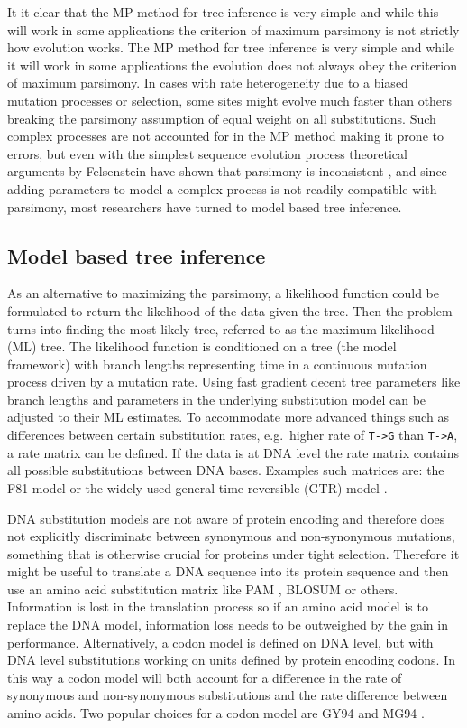 It it clear that the MP method for tree inference is very simple and while this will work in some applications the criterion of maximum parsimony is not strictly how evolution works.
The MP method for tree inference is very simple and while it will work in some applications the evolution does not always obey the criterion of maximum parsimony.
In cases with rate heterogeneity due to a biased mutation processes or selection, some sites might evolve much faster than others breaking the parsimony assumption of equal weight on all substitutions.
Such complex processes are not accounted for in the MP method making it prone to errors, but even with the simplest sequence evolution process theoretical arguments by Felsenstein have shown that parsimony is inconsistent \cite{felsenstein1978cases}, and since adding parameters to model a complex process is not readily compatible with parsimony, most researchers have turned to model based tree inference.




\subsection{Model based tree inference}
As an alternative to maximizing the parsimony, a likelihood function could be formulated to return the likelihood of the data given the tree.
Then the problem turns into finding the most likely tree, referred to as the maximum likelihood (ML) tree.
The likelihood function is conditioned on a tree (the model framework) with branch lengths representing time in a continuous mutation process driven by a mutation rate.
Using fast gradient decent tree parameters like branch lengths and parameters in the underlying substitution model can be adjusted to their ML estimates.
To accommodate more advanced things such as differences between certain substitution rates, e.g.\ higher rate of \texttt{T->G} than \texttt{T->A}, a rate matrix can be defined.
If the data is at DNA level the rate matrix contains all possible substitutions between DNA bases.
Examples such matrices are: the F81 model \cite{felsenstein1981evolutionary} or the widely used general time reversible (GTR) model \cite{tavare1986some}.

DNA substitution models are not aware of protein encoding and therefore does not explicitly discriminate between synonymous and non-synonymous mutations, something that is otherwise crucial for proteins under tight selection.
Therefore it might be useful to translate a DNA sequence into its protein sequence and then use an amino acid substitution matrix like PAM \cite{dayhoff197822}, BLOSUM \cite{henikoff1992amino} or others.
Information is lost in the translation process so if an amino acid model is to replace the DNA model, information loss needs to be outweighed by the gain in performance.
Alternatively, a codon model is defined on DNA level, but with DNA level substitutions working on units defined by protein encoding codons.
In this way a codon model will both account for a difference in the rate of synonymous and non-synonymous substitutions and the rate difference between amino acids.
Two popular choices for a codon model are GY94 \cite{goldman1994codon} and MG94 \cite{muse1994likelihood}.



